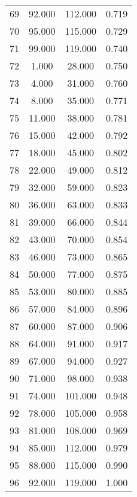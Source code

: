\begin{tabular}{cccc}
  69 & 92.000 & 112.000 & 0.719 \\ 
  70 & 95.000 & 115.000 & 0.729 \\ 
  71 & 99.000 & 119.000 & 0.740 \\ 
  72 & 1.000 & 28.000 & 0.750 \\ 
  73 & 4.000 & 31.000 & 0.760 \\ 
  74 & 8.000 & 35.000 & 0.771 \\ 
  75 & 11.000 & 38.000 & 0.781 \\ 
  76 & 15.000 & 42.000 & 0.792 \\ 
  77 & 18.000 & 45.000 & 0.802 \\ 
  78 & 22.000 & 49.000 & 0.812 \\ 
  79 & 32.000 & 59.000 & 0.823 \\ 
  80 & 36.000 & 63.000 & 0.833 \\ 
  81 & 39.000 & 66.000 & 0.844 \\ 
  82 & 43.000 & 70.000 & 0.854 \\ 
  83 & 46.000 & 73.000 & 0.865 \\ 
  84 & 50.000 & 77.000 & 0.875 \\ 
  85 & 53.000 & 80.000 & 0.885 \\ 
  86 & 57.000 & 84.000 & 0.896 \\ 
  87 & 60.000 & 87.000 & 0.906 \\ 
  88 & 64.000 & 91.000 & 0.917 \\ 
  89 & 67.000 & 94.000 & 0.927 \\ 
  90 & 71.000 & 98.000 & 0.938 \\ 
  91 & 74.000 & 101.000 & 0.948 \\ 
  92 & 78.000 & 105.000 & 0.958 \\ 
  93 & 81.000 & 108.000 & 0.969 \\ 
  94 & 85.000 & 112.000 & 0.979 \\ 
  95 & 88.000 & 115.000 & 0.990 \\ 
  96 & 92.000 & 119.000 & 1.000 \\ 
   \hline
\end{tabular}
